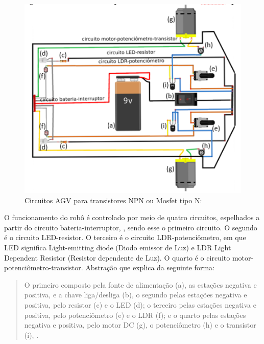 \documentclass[portuguese]{textolivre}
\begin{document}
\begin{figure}[htbp]
\centering
\begin{minipage}{.70\textwidth}
 \includegraphics[width=\textwidth]{figuras/figura 2.png}
 \caption{Circuitos AGV para transistores NPN ou Mosfet tipo N:}
 \label{figura02}
\end{minipage}
\end{figure}

O funcionamento do robô é controlado por meio de quatro circuitos, espelhados a partir do circuito bateria-interruptor, , sendo esse o primeiro circuito. O segundo é o circuito LED-resistor. O terceiro é o circuito LDR-potenciômetro, em que LED significa Light-emitting diode (Diodo emissor de Luz) e LDR Light Dependent Resistor (Resistor dependente de Luz). O quarto é o circuito motor-potenciômetro-transistor. Abstração que \textcite{AlvesMonica2022} explica da seguinte forma:

\begin{quote}
O primeiro composto pela fonte de alimentação (a), as estações negativa e positiva, e a chave liga/desliga (b), o segundo pelas estações negativa e positiva, pelo resistor (c) e o LED (d); o terceiro pelas estações negativa e positiva, pelo potenciômetro (e) e o LDR (f); e o quarto pelas estações negativa e positiva, pelo motor DC (g), o potenciômetro (h) e o transistor (i), \cite[p. 51]{AlvesMonica2022}.
\end{quote}
\end{document}
